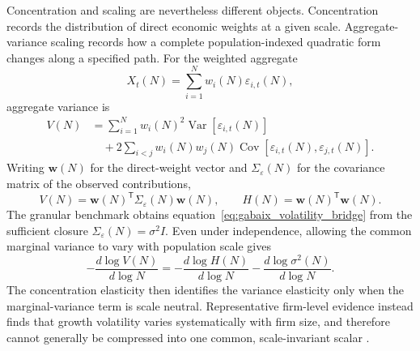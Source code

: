 {Concentration and scaling are nevertheless different objects.
Concentration records the distribution of direct economic weights at a
given scale. Aggregate-variance scaling records how a complete
population-indexed quadratic form changes along a specified path. For
the weighted aggregate
\begin{equation}
    X_t(N)=\sum_{i=1}^{N}w_i(N)\varepsilon_{i,t}(N),
\end{equation}
aggregate variance is
\begin{align}
\label{eq:intro_variance}
    V(N)
    &=
    \sum_{i=1}^{N}w_i(N)^2
    \operatorname{Var}\!\left[\varepsilon_{i,t}(N)\right]
    \nonumber\\
    &\quad+
    2\sum_{i<j}w_i(N)w_j(N)
    \operatorname{Cov}\!\left[
        \varepsilon_{i,t}(N),\varepsilon_{j,t}(N)
    \right].
\end{align}
Writing $\mathbf{w}(N)$ for the direct-weight vector and
$\Sigma_{\varepsilon}(N)$ for the covariance matrix of the observed
contributions,
\begin{equation}
\label{eq:matrix_variance}
    V(N)
    =
    \mathbf{w}(N)^{\mathsf T}
    \Sigma_{\varepsilon}(N)
    \mathbf{w}(N),
    \qquad
    H(N)=\mathbf{w}(N)^{\mathsf T}\mathbf{w}(N).
\end{equation}
The granular benchmark obtains equation~\eqref{eq:gabaix_volatility_bridge}
from the sufficient closure
$\Sigma_{\varepsilon}(N)=\sigma^2 I$. Even under independence, allowing
the common marginal variance to vary with population scale gives
\begin{equation}
\label{eq:benchmark_elasticity_bridge}
    -\frac{d\log V(N)}{d\log N}
    =
    -\frac{d\log H(N)}{d\log N}
    -\frac{d\log \sigma^2(N)}{d\log N}.
\end{equation}
The concentration elasticity then identifies the variance elasticity
only when the marginal-variance term is scale neutral. Representative
firm-level evidence instead finds that growth volatility varies
systematically with firm size, and therefore cannot generally be
compressed into one common, scale-invariant scalar
\citep{calvinoEtAl2018}.

}
